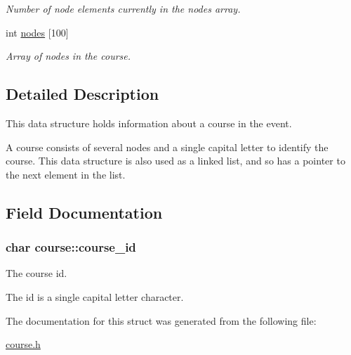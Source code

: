 \begin{DoxyCompactItemize}
\begin{DoxyCompactList}\small\item\em Number of node elements currently in the nodes array. \end{DoxyCompactList}\item 
\hypertarget{structcourse_acd7247aeff5f01d6db0e7aa01867f1da}{int \hyperlink{structcourse_acd7247aeff5f01d6db0e7aa01867f1da}{nodes} \mbox{[}100\mbox{]}}\label{structcourse_acd7247aeff5f01d6db0e7aa01867f1da}

\begin{DoxyCompactList}\small\item\em Array of nodes in the course. \end{DoxyCompactList}\end{DoxyCompactItemize}



\subsection{Detailed Description}
This data structure holds information about a course in the event. 

A course consists of several nodes and a single capital letter to identify the course. This data structure is also used as a linked list, and so has a pointer to the next element in the list. 

\subsection{Field Documentation}
\hypertarget{structcourse_ab027792ebffb0cdd68865f83ed267ada}{
\subsubsection[{course\-\_\-id}]{\setlength{\rightskip}{0pt plus 5cm}char course\-::course\-\_\-id}}\label{structcourse_ab027792ebffb0cdd68865f83ed267ada}


The course id. 

The id is a single capital letter character. 

The documentation for this struct was generated from the following file\-:\begin{DoxyCompactItemize}
\item 
\hyperlink{course_8h}{course.\-h}\end{DoxyCompactItemize}
